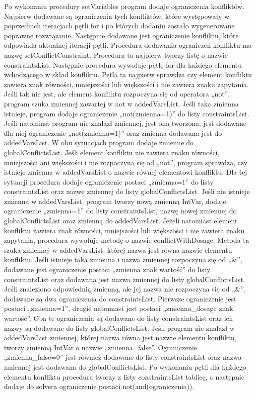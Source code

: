 \documentclass[oneside,a4paper]{book}
\begin{document}
\begin{spacing}{1.5}
Po wykonaniu procedury setVariables program dodaje ograniczenia konfliktów. Najpierw dodawane są ograniczenia tych konfliktów, które występowały w poprzednich iteracjach pętli for i po których dodaniu zostało wygenerowane poprawne rozwiązanie. Następnie dodawane jest ograniczenie konfliktu, które odpowiada aktualnej iteracji pętli. Procedura dodawania ograniczeń konfliktu ma nazwę setConflictConstraint. Procedura ta najpierw tworzy listę o nazwie constraintsList. Następnie procedura wywołuje pętlę for dla każdego elementu wchodzącego w skład konfliktu. Pętla ta najpierw sprawdza czy element konfliktu zawiera znak równości, mniejszości lub większości i nie zawiera znaku zapytania. Jeśli tak nie jest, ale element konfliktu rozpoczyna się od operatora „not”, program szuka zmiennej zawartej w not w addedVarsList. Jeśli taka zmienna istnieje, program dodaje ograniczenie „not(zmienna=1)” do listy constraintsList. Jeśli natomiast program nie znalazł zmiennej, jest ona tworzona, jest dodawane dla niej ograniczenie „not(zmienna=1)” oraz zmienna dodawana jest do addedVarsList. W obu sytuacjach program dodaje zmienne do globalConflictsList. Jeśli element konfliktu nie zawiera znaku równości, mniejszości ani większości i nie rozpoczyna się od „not”, program sprawdza, czy istnieje zmienna w addedVarsList o nazwie równej elementowi konfliktu. Dla tej sytuacji procedura dodaje ograniczenie postaci „zmienna=1” do listy constraintsList oraz nazwę zmiennej do listy globalConflictsList. Jeśli nie istnieje zmienna w addedVarsList, program tworzy nową zmienną IntVar, dodaje ograniczenie „zmienna=1” do listy constraintsList, nazwę nowej zmiennej do globalConflictsList oraz zmienną do addedVarsList. Jeżeli natomiast element konfliktu zawiera znak równości, mniejszości lub większości i nie zawiera znaku zapytania, procedura wywołuje metodę o nazwie conflictWithDosage. Metoda ta szuka zmiennej w addedVarsList, której nazwa jest równa nazwie elementu konfliktu. Jeśli istnieje taka zmienna i nazwa zmiennej rozpoczyna się od „\&”, dodawane jest ograniczenie postaci „zmienna znak wartość” do listy constraintsList oraz dodawana jest nazwa zmiennej do listy globalConflictsList. Jeśli znaleziono odpowiednią zmienną, ale jej nazwa nie rozpoczyna się od „\&”, dodawane są dwa ograniczenia do constraintsList. Pierwsze ograniczenie jest postaci „zmienna=1”, drugie natomiast jest postaci „zmienna\_dosage znak wartość”. Oba te ograniczenia są dodawane do listy constraintsList oraz ich nazwy są dodawane do listy globalConflictsList. Jeśli program nie znalazł w addedVarsList zmiennej, której nazwa równa jest nazwie elementu konfliktu,  tworzy zmienną IntVar o nazwie „zmienna\_false”. Ograniczenie „zmienna\_false=0” jest również dodawane do listy constraintsList oraz nazwa zmiennej jest dodawana do globalConflictsList. Po wykonaniu pętli dla każdego elementu konfliktu procedura tworzy z listy constraintsList tablicę, a następnie dodaje do solvera ograniczenie postaci not(and(ograniczenia)). 


\end{spacing}
\end{document}
